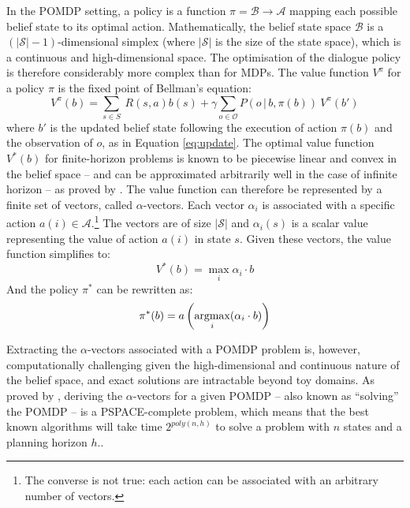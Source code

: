 In the POMDP setting, a policy is a function $\pi = \mathcal{B} \rightarrow \mathcal{A}$ mapping each possible belief state to its optimal action.  Mathematically, the belief state space $\mathcal{B}$ is a $(|\mathcal{S}|\!-\!1)$-dimensional simplex (where $|\mathcal{S}|$ is the size of the state space), which is a continuous and high-dimensional space. The optimisation of the dialogue policy is therefore considerably more complex than for MDPs. The value function $V^{\pi}$ for a policy $\pi$ is the fixed point of Bellman's equation: 
\begin{equation}
V^{\pi}(b) = \sum_{s \in S} \ R(s,a) b(s) + \gamma \sum_{o \in \mathcal{O}} P(o\, |\, b,\pi(b)) \ V^{\pi}(b')
\end{equation}
where $b'$ is the updated belief state following the execution of action $\pi(b)$ and the observation of $o$, as in Equation \eqref{eq:update}.  The optimal value function $V^*(b)$ for finite-horizon problems is known to be piecewise linear and convex in the belief space -- and can be approximated arbitrarily well in the case of infinite horizon -- as proved by \cite{Sondik1971}. The value function can therefore be represented by a finite set of vectors, called $\alpha$-vectors. Each vector $\alpha_i$ is associated with a specific action $a(i) \in \mathcal{A}$.\footnote{The converse is not true: each action can be associated with an arbitrary number of vectors.}  The vectors are of size $|\mathcal{S}|$ and $\alpha_i(s)$ is a scalar value representing the value of action $a(i)$ in state $s$.  Given these vectors, the value function simplifies to:
\begin{equation}
V^*(b) = \max_{i} \alpha_i \cdot b
\end{equation}
And the policy $\pi^*$ can be rewritten as:
\begin{equation}
\pi^*(b) = a\left(\argmax_i(\alpha_i \cdot b)\right)
\end{equation}

Extracting the $\alpha$-vectors associated with a POMDP problem is, however, computationally challenging given the high-dimensional and continuous nature of the belief space, and exact solutions are intractable beyond toy domains. As proved by \cite{Papadimitriou:1987}, deriving the $\alpha$-vectors for a given POMDP -- also known as ``solving'' the POMDP -- is a PSPACE-complete problem, which means that the best known algorithms will take time $2^{poly(n,h)}$ to solve a problem with $n$ states and a planning horizon $h$..


